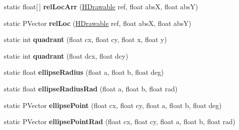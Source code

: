 \begin{DoxyCompactItemize}
\item 
\hypertarget{classhype_1_1util_1_1_h_math_a6b559893c3fc34d449fb74569d69f102}{static float\mbox{[}$\,$\mbox{]} {\bfseries rel\-Loc\-Arr} (\hyperlink{classhype_1_1drawable_1_1_h_drawable}{H\-Drawable} ref, float abs\-X, float abs\-Y)}\label{classhype_1_1util_1_1_h_math_a6b559893c3fc34d449fb74569d69f102}

\item 
\hypertarget{classhype_1_1util_1_1_h_math_aadfd0957687dce7e680a8ffab0677bcf}{static P\-Vector {\bfseries rel\-Loc} (\hyperlink{classhype_1_1drawable_1_1_h_drawable}{H\-Drawable} ref, float abs\-X, float abs\-Y)}\label{classhype_1_1util_1_1_h_math_aadfd0957687dce7e680a8ffab0677bcf}

\item 
\hypertarget{classhype_1_1util_1_1_h_math_a12b9d0f3cfec809876d8381dd59f4bfa}{static int {\bfseries quadrant} (float cx, float cy, float x, float y)}\label{classhype_1_1util_1_1_h_math_a12b9d0f3cfec809876d8381dd59f4bfa}

\item 
\hypertarget{classhype_1_1util_1_1_h_math_a77d4c651da50c90d3b210082f3d7160a}{static int {\bfseries quadrant} (float dcx, float dcy)}\label{classhype_1_1util_1_1_h_math_a77d4c651da50c90d3b210082f3d7160a}

\item 
\hypertarget{classhype_1_1util_1_1_h_math_acd2400df49f165585c7c5069032d3c30}{static float {\bfseries ellipse\-Radius} (float a, float b, float deg)}\label{classhype_1_1util_1_1_h_math_acd2400df49f165585c7c5069032d3c30}

\item 
\hypertarget{classhype_1_1util_1_1_h_math_aeba1842b15edd56fa8cc628098cfb592}{static float {\bfseries ellipse\-Radius\-Rad} (float a, float b, float rad)}\label{classhype_1_1util_1_1_h_math_aeba1842b15edd56fa8cc628098cfb592}

\item 
\hypertarget{classhype_1_1util_1_1_h_math_a57230ddf5b0c28c1868a64904f3f19f7}{static P\-Vector {\bfseries ellipse\-Point} (float cx, float cy, float a, float b, float deg)}\label{classhype_1_1util_1_1_h_math_a57230ddf5b0c28c1868a64904f3f19f7}

\item 
\hypertarget{classhype_1_1util_1_1_h_math_abb716f00b9b50fba0195e964bc976804}{static P\-Vector {\bfseries ellipse\-Point\-Rad} (float cx, float cy, float a, float b, float rad)}\label{classhype_1_1util_1_1_h_math_abb716f00b9b50fba0195e964bc976804}


\end{DoxyCompactItemize}
